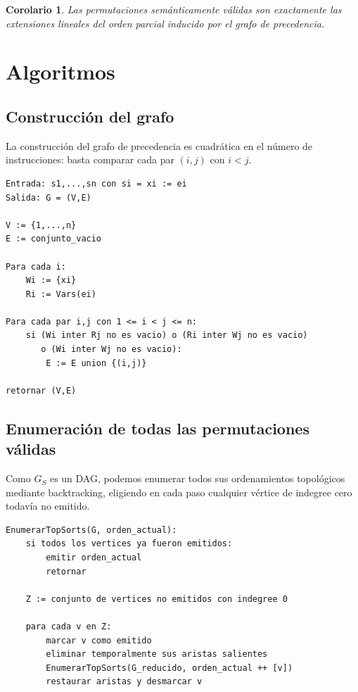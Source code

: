 \documentclass[letterpaper,oneside]{article}
\newtheorem{corollary}[definition]{Corolario}
\theoremstyle{remark}
\begin{document}
\begin{corollary}
Las permutaciones semánticamente válidas son exactamente las extensiones lineales del orden parcial inducido por el grafo de precedencia.
\end{corollary}

\section{Algoritmos}

\subsection{Construcción del grafo}

La construcción del grafo de precedencia es cuadrática en el número de instrucciones: basta comparar cada par $(i,j)$ con $i<j$.

\begin{lstlisting}
Entrada: s1,...,sn con si = xi := ei
Salida: G = (V,E)

V := {1,...,n}
E := conjunto_vacio

Para cada i:
    Wi := {xi}
    Ri := Vars(ei)

Para cada par i,j con 1 <= i < j <= n:
    si (Wi inter Rj no es vacio) o (Ri inter Wj no es vacio)
       o (Wi inter Wj no es vacio):
        E := E union {(i,j)}

retornar (V,E)
\end{lstlisting}

\subsection{Enumeración de todas las permutaciones válidas}

Como $G_S$ es un DAG, podemos enumerar todos sus ordenamientos topológicos mediante backtracking, eligiendo en cada paso cualquier vértice de indegree cero todavía no emitido.

\begin{lstlisting}
EnumerarTopSorts(G, orden_actual):
    si todos los vertices ya fueron emitidos:
        emitir orden_actual
        retornar

    Z := conjunto de vertices no emitidos con indegree 0

    para cada v en Z:
        marcar v como emitido
        eliminar temporalmente sus aristas salientes
        EnumerarTopSorts(G_reducido, orden_actual ++ [v])
        restaurar aristas y desmarcar v
\end{lstlisting}
\end{document}
